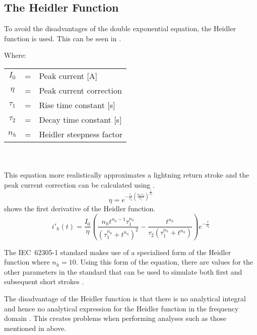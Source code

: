 \subsection{The Heidler Function}
\label{sub:background_heidler}
To avoid the disadvantages of the double exponential equation, the Heidler function is used. This can be seen in .

Where: \\
\begin{tabular}{cll}
    $I_0$ & = & Peak current [A] \\
    $\eta$ & = & Peak current correction \\
    $\tau_1$ & = & Rise time constant [s] \\
    $\tau_2$ & = & Decay time constant [s] \\
    $n_h$ & = & Heidler steepness factor
\end{tabular}\\\\
This equation more realistically approximates a lightning return stroke and the peak current correction can be calculated using  \cite{ZhangFeizhouandLiuShanghe2002,Lovric2013,Delfino2012,Javor2011,Heidler1999}.
\begin{equation}
    \eta =e^{-\frac{\tau _1}{\tau _2} \left(\frac{n_h \tau _2}{\tau _1}\right)^{\frac{1}{n_h}}}
    \label{eqn:eta}
\end{equation}
 shows the first derivative of the Heidler function.
\begin{equation}
    i'_h \left( t \right) = \frac{I_0}{\eta} \left( \frac{n_h t^{n_h - 1} \tau_1^{n_h}}{\left(\tau_1^{n_h} + t^{n_h} \right)^2} - \frac{t^{n_h}}{\tau_2 \left(\tau_1^{n_h} + t^{n_h} \right)} \right) e^{-\frac{t}{\tau_2}}
    \label{eqn:dHF}
\end{equation}

The IEC~62305-1 standard makes use of a specialised form of the Heidler function where $n_h = 10$. Using this form of the equation, there are values for the other parameters in the standard that can be used to simulate both first and subsequent short strokes \cite{IEC623051,Heidler2008}.

The disadvantage of the Heidler function is that there is no analytical integral and hence no analytical expression for the Heidler function in the frequency domain \cite{ZhangFeizhouandLiuShanghe2002,Lovric2013}. This creates problems when performing analyses such as those mentioned in  above.

